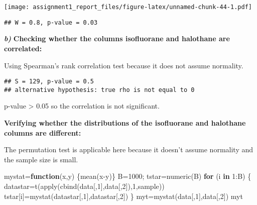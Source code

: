 \documentclass[
]{article}
\newenvironment{Shaded}{\begin{snugshade}}{\end{snugshade}}
\newcommand{\AttributeTok}[1]{\textcolor[rgb]{0.77,0.63,0.00}{#1}}
\newcommand{\ControlFlowTok}[1]{\textcolor[rgb]{0.13,0.29,0.53}{\textbf{#1}}}
\newcommand{\DecValTok}[1]{\textcolor[rgb]{0.00,0.00,0.81}{#1}}
\newcommand{\FunctionTok}[1]{\textcolor[rgb]{0.00,0.00,0.00}{#1}}
\newcommand{\NormalTok}[1]{#1}
\newcommand{\OtherTok}[1]{\textcolor[rgb]{0.56,0.35,0.01}{#1}}
\newcommand{\SpecialCharTok}[1]{\textcolor[rgb]{0.00,0.00,0.00}{#1}}
\newcommand{\StringTok}[1]{\textcolor[rgb]{0.31,0.60,0.02}{#1}}
\begin{document}
\texttt{[image: assignment1\_report\_files/figure-latex/unnamed-chunk-44-1.pdf]}

\begin{Shaded}
\end{Shaded}

\begin{verbatim}
## W = 0.8, p-value = 0.03
\end{verbatim}

\textbf{\emph{b)}} \textbf{Checking whether the columns isofluorane and
halothane are correlated:}

Using Spearman's rank correlation test because it does not assume
normality.

\begin{Shaded}
\end{Shaded}

\begin{verbatim}
## S = 129, p-value = 0.5
## alternative hypothesis: true rho is not equal to 0
\end{verbatim}

p-value \textgreater{} 0.05 so the correlation is not significant.

\textbf{Verifying whether the distributions of the isofluorane and
halothane columns are different:}

The permutation test is applicable here because it doesn't assume
normality and the sample size is small.

\begin{Shaded}
\begin{Highlighting}[]
\NormalTok{mystat}\OtherTok{=}\ControlFlowTok{function}\NormalTok{(x,y) \{}\FunctionTok{mean}\NormalTok{(x}\SpecialCharTok{{-}}\NormalTok{y)\}}
\NormalTok{B}\OtherTok{=}\DecValTok{1000}\NormalTok{; tstar}\OtherTok{=}\FunctionTok{numeric}\NormalTok{(B)}
\ControlFlowTok{for}\NormalTok{ (i }\ControlFlowTok{in} \DecValTok{1}\SpecialCharTok{:}\NormalTok{B) \{}
\NormalTok{  datastar}\OtherTok{=}\FunctionTok{t}\NormalTok{(}\FunctionTok{apply}\NormalTok{(}\FunctionTok{cbind}\NormalTok{(data[,}\DecValTok{1}\NormalTok{],data[,}\DecValTok{2}\NormalTok{]),}\DecValTok{1}\NormalTok{,sample))}
\NormalTok{  tstar[i]}\OtherTok{=}\FunctionTok{mystat}\NormalTok{(datastar[,}\DecValTok{1}\NormalTok{],datastar[,}\DecValTok{2}\NormalTok{]) \}}
\NormalTok{myt}\OtherTok{=}\FunctionTok{mystat}\NormalTok{(data[,}\DecValTok{1}\NormalTok{],data[,}\DecValTok{2}\NormalTok{])}
\NormalTok{myt}
\end{Highlighting}
\end{Shaded}
\end{document}
